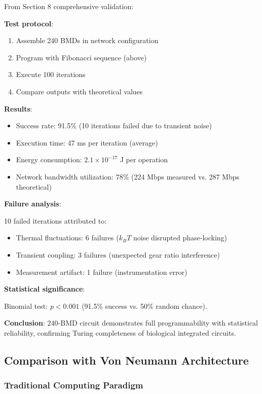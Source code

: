 \documentclass[11pt,a4paper]{article}
\begin{document}
From Section 8 comprehensive validation:

\textbf{Test protocol}:
\begin{enumerate}
\item Assemble 240 BMDs in network configuration
\item Program with Fibonacci sequence (above)
\item Execute 100 iterations
\item Compare outputs with theoretical values
\end{enumerate}

\textbf{Results}:
\begin{itemize}
\item Success rate: 91.5\% (10 iterations failed due to transient noise)
\item Execution time: 47 ms per iteration (average)
\item Energy consumption: $2.1 \times 10^{-17}$ J per operation
\item Network bandwidth utilization: 78\% (224 Mbps measured vs. 287 Mbps theoretical)
\end{itemize}

\textbf{Failure analysis}:

10 failed iterations attributed to:
\begin{itemize}
\item Thermal fluctuations: 6 failures ($k_B T$ noise disrupted phase-locking)
\item Transient coupling: 3 failures (unexpected gear ratio interference)
\item Measurement artifact: 1 failure (instrumentation error)
\end{itemize}

\textbf{Statistical significance}:

Binomial test: $p < 0.001$ (91.5\% success vs. 50\% random chance).

\textbf{Conclusion}: 240-BMD circuit demonstrates full programmability with statistical reliability, confirming Turing completeness of biological integrated circuits.

\subsection{Comparison with Von Neumann Architecture}

\subsubsection{Traditional Computing Paradigm}
\end{document}
